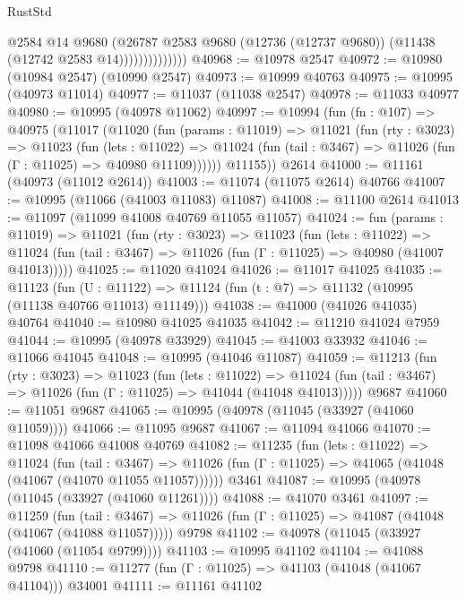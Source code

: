 \begin{lexlean}{RustStd}
\begin{coremodule}
                          @2584
                          @14
                          @9680
                          (@26787
                            @2583
                            @9680
                            (@12736 (@12737 @9680))
                            (@11438 (@12742 @2583 @14))))))))))))))
@40968 := @10978 @2547
@40972 := @10980 (@10984 @2547) (@10990 @2547)
@40973 := @10999 @40763
@40975 := @10995 (@40973 @11014)
@40977 := @11037 (@11038 @2547)
@40978 := @11033 @40977
@40980 := @10995 (@40978 @11062)
@40997 := @10994
    (fun (fn : @107) =>
    @40975
      (@11017
        (@11020
          (fun (params : @11019) =>
          @11021
            (fun (rty : @3023) =>
            @11023
              (fun (lets : @11022) =>
              @11024 (fun (tail : @3467) => @11026 (fun (Γ : @11025) => @40980 @11109))))))
        @11155))
    @2614
@41000 := @11161 (@40973 (@11012 @2614))
@41003 := @11074 (@11075 @2614) @40766
@41007 := @10995 (@11066 (@41003 @11083) @11087)
@41008 := @11100 @2614
@41013 := @11097 (@11099 @41008 @40769 @11055 @11057)
@41024 := fun (params : @11019) =>
  @11021
    (fun (rty : @3023) =>
    @11023
      (fun (lets : @11022) =>
      @11024 (fun (tail : @3467) => @11026 (fun (Γ : @11025) => @40980 (@41007 @41013)))))
@41025 := @11020 @41024
@41026 := @11017 @41025
@41035 := @11123
    (fun (U : @11122) => @11124 (fun (t : @7) => @11132 (@10995 (@11138 @40766 @11013) @11149)))
@41038 := @41000 (@41026 @41035) @40764
@41040 := @10980 @41025 @41035
@41042 := @11210 @41024 @7959
@41044 := @10995 (@40978 @33929)
@41045 := @41003 @33932
@41046 := @11066 @41045
@41048 := @10995 (@41046 @11087)
@41059 := @11213
    (fun (rty : @3023) =>
    @11023
      (fun (lets : @11022) =>
      @11024 (fun (tail : @3467) => @11026 (fun (Γ : @11025) => @41044 (@41048 @41013)))))
    @9687
@41060 := @11051 @9687
@41065 := @10995 (@40978 (@11045 (@33927 (@41060 @11059))))
@41066 := @11095 @9687
@41067 := @11094 @41066
@41070 := @11098 @41066 @41008 @40769
@41082 := @11235
    (fun (lets : @11022) =>
    @11024
      (fun (tail : @3467) =>
      @11026 (fun (Γ : @11025) => @41065 (@41048 (@41067 (@41070 @11055 @11057))))))
    @3461
@41087 := @10995 (@40978 (@11045 (@33927 (@41060 @11261))))
@41088 := @41070 @3461
@41097 := @11259
    (fun (tail : @3467) => @11026 (fun (Γ : @11025) => @41087 (@41048 (@41067 (@41088 @11057)))))
    @9798
@41102 := @40978 (@11045 (@33927 (@41060 (@11054 @9799))))
@41103 := @10995 @41102
@41104 := @41088 @9798
@41110 := @11277 (fun (Γ : @11025) => @41103 (@41048 (@41067 @41104))) @34001
@41111 := @11161 @41102

\end{coremodule}
\end{lexlean}
